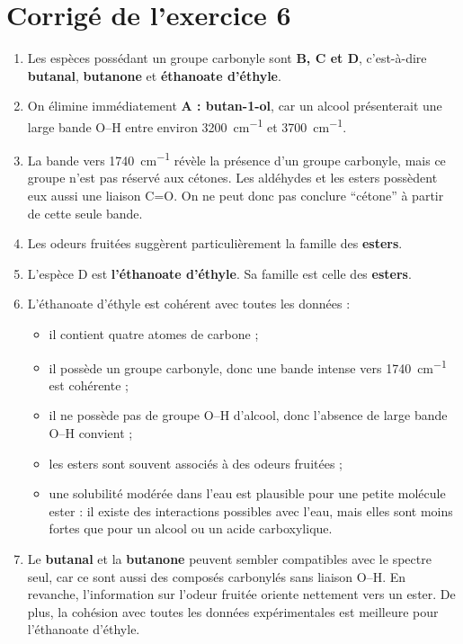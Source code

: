 \documentclass[11pt,a4paper]{article}
\begin{document}
\section*{Corrigé de l'exercice 6}
\begin{enumerate}[label=\textbf{\arabic*.},leftmargin=1.2em]
    \item Les espèces possédant un groupe carbonyle sont \textbf{B, C et D}, c'est-à-dire \textbf{butanal}, \textbf{butanone} et \textbf{éthanoate d'éthyle}.

    \item On élimine immédiatement \textbf{A : butan-1-ol}, car un alcool présenterait une large bande O--H entre environ \SI{3200}{cm^{-1}} et \SI{3700}{cm^{-1}}.

    \item La bande vers \SI{1740}{cm^{-1}} révèle la présence d'un groupe carbonyle, mais ce groupe n'est pas réservé aux cétones. Les aldéhydes et les esters possèdent eux aussi une liaison C=O. On ne peut donc pas conclure ``cétone'' à partir de cette seule bande.

    \item Les odeurs fruitées suggèrent particulièrement la famille des \textbf{esters}.

    \item L'espèce D est \textbf{l'éthanoate d'éthyle}. Sa famille est celle des \textbf{esters}.

    \item L'éthanoate d'éthyle est cohérent avec toutes les données :
    \begin{itemize}[leftmargin=1.2em]
        \item il contient quatre atomes de carbone ;
        \item il possède un groupe carbonyle, donc une bande intense vers \SI{1740}{cm^{-1}} est cohérente ;
        \item il ne possède pas de groupe O--H d'alcool, donc l'absence de large bande O--H convient ;
        \item les esters sont souvent associés à des odeurs fruitées ;
        \item une solubilité modérée dans l'eau est plausible pour une petite molécule ester : il existe des interactions possibles avec l'eau, mais elles sont moins fortes que pour un alcool ou un acide carboxylique.
    \end{itemize}

    \item Le \textbf{butanal} et la \textbf{butanone} peuvent sembler compatibles avec le spectre seul, car ce sont aussi des composés carbonylés sans liaison O--H. En revanche, l'information sur l'odeur fruitée oriente nettement vers un ester. De plus, la cohésion avec toutes les données expérimentales est meilleure pour l'éthanoate d'éthyle.


\end{enumerate}
\end{document}
